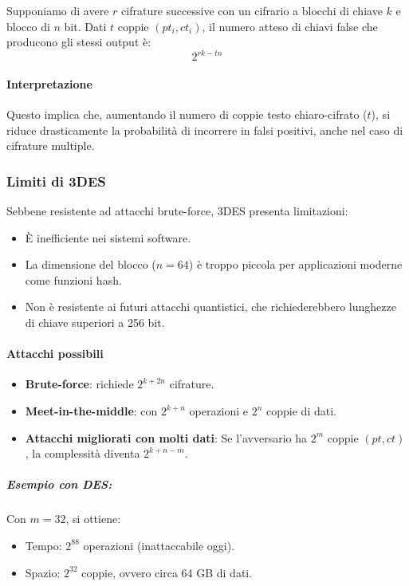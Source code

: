 \documentclass{report}
\begin{document}
Supponiamo di avere $r$ cifrature successive con un cifrario a blocchi di chiave $k$ e blocco di $n$ bit. Dati $t$ coppie $(pt_i, ct_i)$, il numero atteso di chiavi false che producono gli stessi output è:
\[
2^{rk - tn}
\]

\paragraph{Interpretazione}

Questo implica che, aumentando il numero di coppie testo chiaro-cifrato ($t$), si riduce drasticamente la probabilità di incorrere in falsi positivi, anche nel caso di cifrature multiple.

\subsubsection{Limiti di 3DES}

Sebbene resistente ad attacchi brute-force, 3DES presenta limitazioni:
\begin{itemize}
    \item È inefficiente nei sistemi software.
    \item La dimensione del blocco ($n = 64$) è troppo piccola per applicazioni moderne come funzioni hash.
    \item Non è resistente ai futuri attacchi quantistici, che richiederebbero lunghezze di chiave superiori a 256 bit.
\end{itemize}


\paragraph{Attacchi possibili}

\begin{itemize}
    \item \textbf{Brute-force}: richiede $2^{k + 2n}$ cifrature.
    \item \textbf{Meet-in-the-middle}: con $2^{k + n}$ operazioni e $2^n$ coppie di dati.
    \item \textbf{Attacchi migliorati con molti dati}: Se l'avversario ha $2^m$ coppie $(pt, ct)$, la complessità diventa $2^{k+n-m}$.
\end{itemize}

\subparagraph{Esempio con DES:}

Con $m = 32$, si ottiene:
\begin{itemize}
    \item Tempo: $2^{88}$ operazioni (inattaccabile oggi).
    \item Spazio: $2^{32}$ coppie, ovvero circa 64 GB di dati.
\end{itemize}
\end{document}

